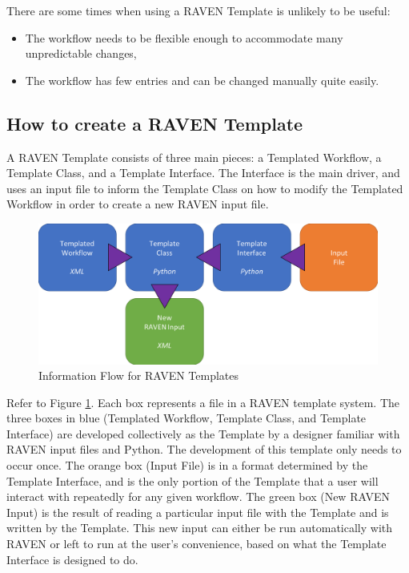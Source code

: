 There are some times when using a RAVEN Template is unlikely to be useful:
\begin{itemize}
  \item The workflow needs to be flexible enough to accommodate many unpredictable changes,
  \item The workflow has few entries and can be changed manually quite easily.
\end{itemize}

\subsection{How to create a RAVEN Template}
A RAVEN Template consists of three main pieces: a Templated Workflow, a Template Class, and a Template Interface. The Interface is the main driver, and uses an input file to inform the Template Class on how to modify the Templated Workflow in order to create a new RAVEN input file.

\begin{figure}[h!]
 \centering
 \includegraphics[width=\textwidth]{pics/TemplateWorkflow.png}
 \caption{Information Flow for RAVEN Templates}
 \label{fig:raven template workflow}
\end{figure}

Refer to Figure \ref{fig:raven template workflow}. Each box represents a file in a RAVEN template system. The three boxes in blue (Templated Workflow, Template Class, and Template Interface) are developed collectively as the Template  by a designer familiar with RAVEN input files and Python. The development of this template only needs to occur once. The orange box (Input File) is in a format determined by the Template Interface, and is the only portion of the Template that a user will interact with repeatedly for any given workflow. The green box (New RAVEN Input) is the result of reading a particular input file with the Template and is written by the Template. This new input can either be run automatically with RAVEN or left to run at the user's convenience, based on what the Template Interface is designed to do.
\\

